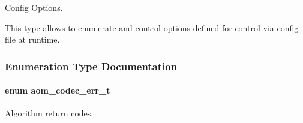 Config Options. 

This type allows to enumerate and control options defined for control via config file at runtime. 

\subsubsection{Enumeration Type Documentation}
\paragraph[{\texorpdfstring{aom\+\_\+codec\+\_\+err\+\_\+t}{aom_codec_err_t}}]{\setlength{\rightskip}{0pt plus 5cm}enum {\bf aom\+\_\+codec\+\_\+err\+\_\+t}}\hypertarget{group__codec_gaaae61e0f8663e6137f1e228757248e7c}{}\label{group__codec_gaaae61e0f8663e6137f1e228757248e7c}


Algorithm return codes. 

